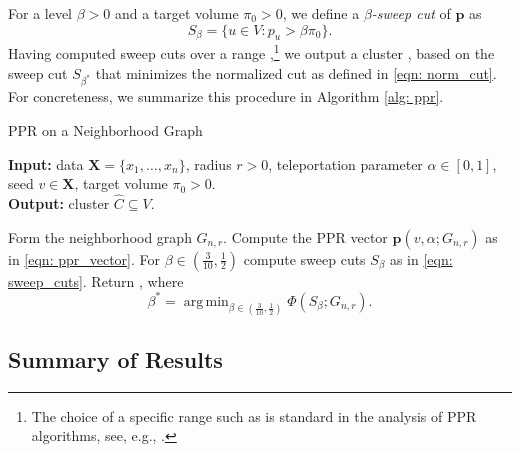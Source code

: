 \documentclass{article}
\newcommand{\1}{\mathbf{1}}
\newcommand{\pbf}{\mathbf{p}}
\newcommand{\Xbf}{\mathbf{X}}
\DeclareMathOperator*{\argmin}{arg\,min}
\theoremstyle{aldenthm}
\theoremstyle{aldenrmrk}
\begin{document}
For a level $\beta > 0$ and a target volume $\pi_0 > 0$, we define a
\emph{$\beta$-sweep cut} of $\pbf$ as  
\begin{equation}
\label{eqn: sweep_cuts}
S_\beta = \{u \in V: p_u > \beta \pi_{0}\}.
\end{equation}
Having computed sweep cuts over a range ,\footnote{The choice of a specific range such as 
 is standard in the analysis of PPR
algorithms, see, e.g., \citet{zhu2013}.}
we output a cluster , based on the sweep cut
$S_{\beta^*}$ that minimizes the normalized cut  as defined in \eqref{eqn: norm_cut}. For concreteness, we summarize
this procedure in Algorithm \ref{alg: ppr}.   

\begin{algorithm}
\caption{PPR on a Neighborhood Graph}
\label{alg: ppr}	
{\bfseries Input:} data $\Xbf=\{x_1,\ldots,x_n\}$, radius $r > 0$, teleportation 
parameter $\alpha \in [0,1]$, seed $v \in \Xbf$, target volume $\pi_0 >
0$. \\   
{\bfseries Output:} cluster $\widehat{C} \subseteq V$.
\begin{algorithmic}[1]
  \STATE Form the neighborhood graph $G_{n,r}$.
  \STATE Compute the PPR vector $\pbf(v, \alpha; G_{n,r})$ as in \eqref{eqn:
    ppr_vector}. 
  \STATE For $\beta \in (\frac{3}{10}, \frac{1}{2})$ compute sweep cuts
  $S_{\beta}$ as in \eqref{eqn: sweep_cuts}.
  \STATE Return , where 
  $$
  \beta^* = \argmin_{\beta \in (\frac{3}{10}, \frac{1}{2})} \Phi(S_{\beta}; G_{n,r}).
  $$
\end{algorithmic}
\end{algorithm}

\subsection{Summary of Results}

\end{document}
